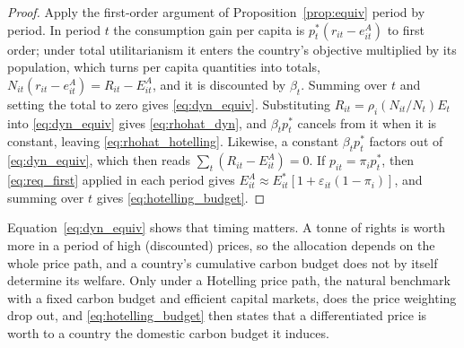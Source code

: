 \documentclass[12pt,english]{article}
\theoremstyle{remark}
\begin{document}
\begin{proof}
Apply the first-order argument of Proposition~\ref{prop:equiv} period by period. In period $t$ the consumption gain per capita is $p^*_t(r_{it}-e^A_{it})$ to first order; under total utilitarianism it enters the country's objective multiplied by its population, which turns per capita quantities into totals, $N_{it}(r_{it}-e^A_{it})=R_{it}-E^A_{it}$, and it is discounted by $\beta_t$. Summing over $t$ and setting the total to zero gives \eqref{eq:dyn_equiv}. Substituting $R_{it}=\rho_i(N_{it}/N_t)E_t$ into \eqref{eq:dyn_equiv} gives \eqref{eq:rhohat_dyn}, and $\beta_t p^*_t$ cancels from it when it is constant, leaving \eqref{eq:rhohat_hotelling}. Likewise, a constant $\beta_t p^*_t$ factors out of \eqref{eq:dyn_equiv}, which then reads $\sum_t (R_{it}-E^A_{it})=0$. If $p_{it}=\pi_i p^*_t$, then \eqref{eq:req_first} applied in each period gives $E^A_{it}\approx E^*_{it}[1+\varepsilon_{it}(1-\pi_i)]$, and summing over $t$ gives \eqref{eq:hotelling_budget}.
\end{proof}

Equation~\eqref{eq:dyn_equiv} shows that timing matters. A tonne of rights is worth more in a period of high (discounted) prices, so the allocation depends on the whole price path, and a country's cumulative carbon budget does not by itself determine its welfare.
Only under a Hotelling price path, the natural benchmark with a fixed carbon budget and efficient capital markets, does the price weighting drop out, and \eqref{eq:hotelling_budget} then states that a differentiated price is worth to a country the domestic carbon budget it induces. %

\end{document}
